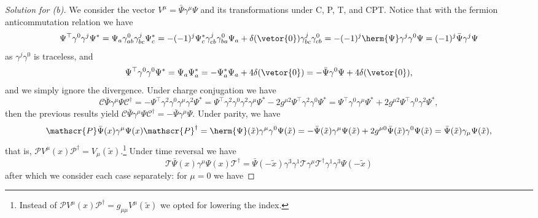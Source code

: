 \begin{proof}[Solution for (b)]
   We consider the vector \(V^\mu = \bar{\Psi} \gamma^\mu \Psi\) and its transformations under C, P, T, and CPT. 
   Notice that with the fermion anticommutation relation we have
   \begin{equation*}
      \Psi^\top \gamma^0 \gamma^j \Psi^* =  \Psi_a \gamma^{0}_{ab} \gamma^j_{bc} \Psi^*_{c} =-(-1)^j\Psi^*_c \gamma^{j}_{cb} \gamma^{0}_{ba} \Psi_a + \delta(\vetor{0}) \gamma^{j}_{bc} \gamma^0_{cb} = -(-1)^j\herm{\Psi} \gamma^j \gamma^0 \Psi = (-1)^{j}\bar{\Psi} \gamma^j \Psi
   \end{equation*}
   as \(\gamma^j \gamma^0\) is traceless, and 
   \begin{equation*}
      \Psi^\top \gamma^0 \gamma^0 \Psi^* = \Psi_a \Psi^*_a = -\Psi^*_a \Psi_a + 4\delta(\vetor{0}) = - \bar{\Psi} \gamma^0 \Psi + 4\delta(\vetor{0}),
   \end{equation*}
   and we simply ignore the divergence. Under charge conjugation we have
   \begin{equation*}
      \mathscr{C} \bar{\Psi} \gamma^\mu \Psi \mathscr{C}^\dag = - \Psi^\top \gamma^2 \gamma^0 \gamma^\mu\gamma^2 \Psi^* = \Psi^\top \gamma^2 \gamma^0 \gamma^2 \gamma^\mu \Psi^* - 2 g^{\mu 2} \Psi^\top \gamma^2 \gamma^0 \Psi^* = \Psi^\top \gamma^0 \gamma^\mu \Psi^* + 2g^{\mu 2} \Psi^\top \gamma^0 \gamma^2 \Psi^*,
   \end{equation*}
   then the previous results yield \(\mathscr{C} \bar{\Psi} \gamma^\mu \Psi \mathscr{C}^\dag = -\bar{\Psi} \gamma^\mu \Psi\). Under parity, we have
   \begin{equation*}
      \mathscr{P} \bar{\Psi}(x) \gamma^\mu \Psi(x) \mathscr{P}^\dag = \herm{\Psi}(\tilde{x}) \gamma^\mu \gamma^0 \Psi(\tilde{x}) = -\bar{\Psi}(\tilde{x}) \gamma^\mu \Psi(\tilde{x}) + 2g^{\mu0} \bar{\Psi}(\tilde{x}) \gamma^0 \Psi(\tilde{x}) = \bar{\Psi}(\tilde{x}) \gamma_\mu \Psi(\tilde{x}),
   \end{equation*}
   that is, \(\mathscr{P} V^\mu(x) \mathscr{P}^\dag = V_\mu(\tilde{x}).\)\footnote{Instead of \(\mathscr{P} V^\mu(x) \mathscr{P}^\dag = g_{\mu\mu}V^\mu( \tilde{x})\) we opted for lowering the index.} Under time reversal we have 
   \begin{equation*}
      \mathscr{T} \bar{\Psi}(x) \gamma^\mu \Psi(x) \mathscr{T}^\dag = \bar{\Psi}(- \tilde{x}) \gamma^3 \gamma^1 \mathscr{T}\gamma^\mu\mathscr{T}^\dag \gamma^1 \gamma^3 \Psi( - \tilde{x})
   \end{equation*}
   after which we consider each case separately: for \(\mu = 0\) we have

\end{proof}
